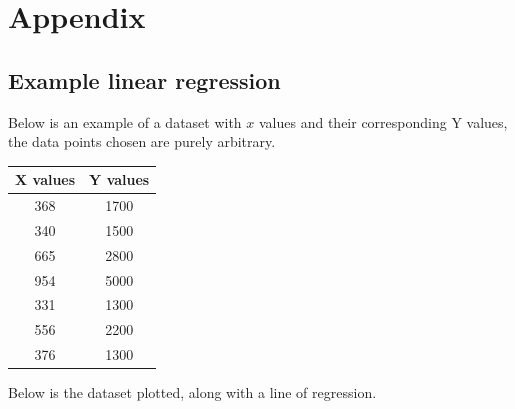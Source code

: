 \documentclass[11pt,letterpaper]{article}
\begin{document}
\printbibliography[heading=bibintoc, title=Works Cited]

\appendix
\section{Appendix}
\label{app}
\subsection{Example linear regression}
\label{app:regression}

Below is an example of a dataset with $x$ values and their corresponding
Y values, the data points chosen are purely arbitrary.

\begin{center}
    \begin{tabular}{||c c||}
        \hline
        X values & Y values \\ [0.5ex]
        \hline\hline
        368      & 1700     \\
        \hline
        340      & 1500     \\
        \hline
        665      & 2800     \\
        \hline
        954      & 5000     \\
        \hline
        331      & 1300     \\
        \hline
        556      & 2200     \\
        \hline
        376      & 1300     \\ [1ex]
        \hline
    \end{tabular}
\end{center}

\table

Below is the dataset plotted, along with a line of regression.
\end{document}
